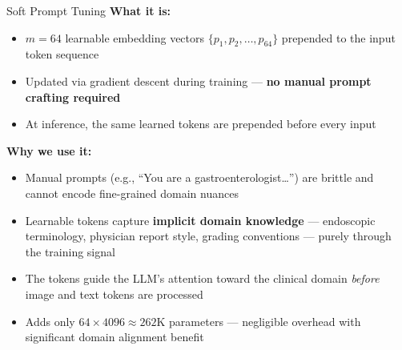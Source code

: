﻿\documentclass[aspectratio=169]{beamer}
\newcommand{\scite}[1]{{\footnotesize\color{darkgray}\citet{#1}}}
\begin{document}
\begin{frame}{Soft Prompt Tuning}
\vspace{0.2em}
\textbf{What it is:} \scite{plora2022liu}
\begin{itemize}
    \item $m = 64$ learnable embedding vectors $\{p_1, p_2, \ldots, p_{64}\}$ prepended to the input token sequence
    \item Updated via gradient descent during training --- \textbf{no manual prompt crafting required}
    \item At inference, the same learned tokens are prepended before every input
\end{itemize}
\vspace{0.5em}
\textbf{Why we use it:}
\begin{itemize}
    \item Manual prompts (e.g., ``You are a gastroenterologist\ldots'') are brittle and cannot encode fine-grained domain nuances
    \item Learnable tokens capture \textbf{implicit domain knowledge} --- endoscopic terminology, physician report style, grading conventions --- purely through the training signal
    \item The tokens guide the LLM's attention toward the clinical domain \textit{before} image and text tokens are processed
    \item Adds only $64 \times 4096 \approx 262$K parameters --- negligible overhead with significant domain alignment benefit
\end{itemize}
\end{frame}
\end{document}
